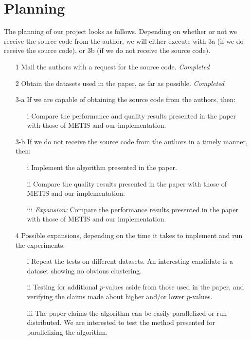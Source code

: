 \documentclass[a4paper,11pt]{article}
\begin{document}
\section{Planning}
The planning of our project looks as follows. Depending on whether or not we receive the source code from the author, we will either execute with 3a (if we do receive the source code), or 3b (if we do not receive the source code).
\begin{enumerate}
\item[1] Mail the authors with a request for the source code. \textit{Completed}\item[2] Obtain the datasets used in the paper, as far as possible. \textit{Completed}
\item[3-a] If we are capable of obtaining the source code from the authors, then:
\begin{enumerate}
\item[i] Compare the performance and quality results presented in the paper with those of METIS and our implementation.
\end{enumerate}
\item[3-b] If we do not receive the source code from the authors in a timely manner, then:
\begin{enumerate}
\item[i] Implement the algorithm presented in the paper.
\item[ii] Compare the quality results presented in the paper with those of METIS and our implementation.
\item[iii] \textit{Expansion:} Compare the performance results presented in the paper with those of METIS and our implementation.
\end{enumerate}
\item[4] Possible expansions, depending on the time it takes to implement and run the experiments:
\begin{enumerate}
\item[i] Repeat the tests on different datasets. An interesting candidate is a dataset showing no obvious clustering. %
\item[ii] Testing for additional $p$-values aside from those used in the paper, and verifying the claims made about higher and/or lower $p$-values.
\item[iii] The paper claims the algorithm can be easily parallelized or run distributed. We are interested to test the method presented for parallelizing the algorithm.
\end{enumerate}
\end{enumerate}
\end{document}

